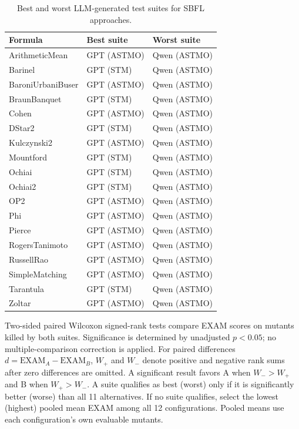 \begin{table}[t]
\centering
\caption{Best and worst LLM-generated test suites for SBFL approaches.}
\label{tab:rq3bw-selection}
\begin{tabular}{lll}
\toprule
Formula & Best suite & Worst suite \\
\midrule
ArithmeticMean & GPT (ASTMO) & Qwen (ASTMO) \\
Barinel & GPT (STM) & Qwen (ASTMO) \\
BaroniUrbaniBuser & GPT (ASTMO) & Qwen (ASTMO) \\
BraunBanquet & GPT (STM) & Qwen (ASTMO) \\
Cohen & GPT (ASTMO) & Qwen (ASTMO) \\
DStar2 & GPT (STM) & Qwen (ASTMO) \\
Kulczynski2 & GPT (ASTMO) & Qwen (ASTMO) \\
Mountford & GPT (STM) & Qwen (ASTMO) \\
Ochiai & GPT (STM) & Qwen (ASTMO) \\
Ochiai2 & GPT (STM) & Qwen (ASTMO) \\
OP2 & GPT (ASTMO) & Qwen (ASTMO) \\
Phi & GPT (ASTMO) & Qwen (ASTMO) \\
Pierce & GPT (ASTMO) & Qwen (ASTMO) \\
RogersTanimoto & GPT (ASTMO) & Qwen (ASTMO) \\
RussellRao & GPT (ASTMO) & Qwen (ASTMO) \\
SimpleMatching & GPT (ASTMO) & Qwen (ASTMO) \\
Tarantula & GPT (STM) & Qwen (ASTMO) \\
Zoltar & GPT (ASTMO) & Qwen (ASTMO) \\
\bottomrule
\end{tabular}
\par\smallskip
\begin{minipage}{\linewidth}\footnotesize Two-sided paired Wilcoxon signed-rank tests compare EXAM scores on mutants killed by both suites. Significance is determined by unadjusted $p<0.05$; no multiple-comparison correction is applied. For paired differences $d=\mathrm{EXAM}_{A}-\mathrm{EXAM}_{B}$, $W_+$ and $W_-$ denote positive and negative rank sums after zero differences are omitted. A significant result favors A when $W_->W_+$ and B when $W_+>W_-$. A suite qualifies as best (worst) only if it is significantly better (worse) than all 11 alternatives. If no suite qualifies, select the lowest (highest) pooled mean EXAM among all 12 configurations. Pooled means use each configuration's own evaluable mutants. 
\end{minipage}
\end{table}
